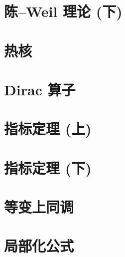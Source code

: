 \documentclass[twoside]{article}
\begin{document}


\section{陈--Weil 理论 (下)} \label{sect-6}



\section{热核} \label{sect-7}



\section{Dirac 算子} \label{sect-8}



\section{指标定理 (上)} \label{sect-9}



\section{指标定理 (下)} \label{sect-10}



\section{等变上同调} \label{sect-11}



\section{局部化公式} \label{sect-12}



\printbibliography
\end{document}

